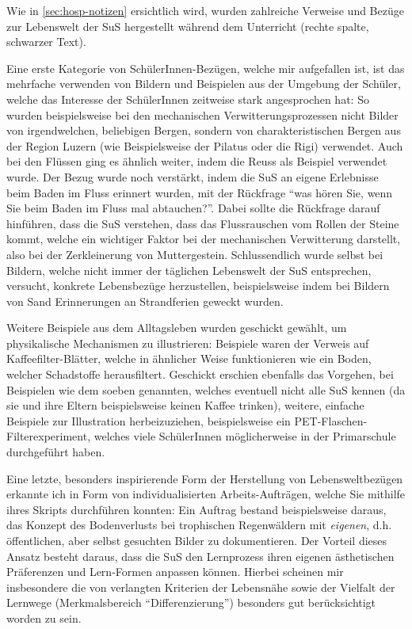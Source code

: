 Wie in \cref{sec:hosp-notizen} ersichtlich wird, wurden zahlreiche Verweise und Bezüge zur Lebenswelt der SuS hergestellt während dem Unterricht (rechte spalte, schwarzer Text).

Eine erste Kategorie von SchülerInnen-Bezügen, welche mir aufgefallen ist, ist das mehrfache verwenden von Bildern und Beispielen aus der Umgebung der Schüler, welche das Interesse der SchülerInnen zeitweise stark angesprochen hat: So wurden beispielsweise bei den mechanischen Verwitterungsprozessen nicht Bilder von irgendwelchen, beliebigen Bergen, sondern von charakteristischen Bergen aus der Region Luzern (wie Beispielsweise der Pilatus oder die Rigi) verwendet. Auch bei den Flüssen ging es ähnlich weiter, indem die Reuss als Beispiel verwendet wurde. Der Bezug wurde noch verstärkt, indem die SuS an eigene Erlebnisse beim Baden im Fluss erinnert wurden, mit der Rückfrage \enquote{was hören Sie, wenn Sie beim Baden im Fluss mal abtauchen?}. Dabei sollte die Rückfrage darauf hinführen, dass die SuS verstehen, dass das Flussrauschen vom Rollen der Steine kommt, welche ein wichtiger Faktor bei der mechanischen Verwitterung darstellt, also bei der Zerkleinerung von Muttergestein. Schlussendlich wurde selbst bei Bildern, welche nicht immer der täglichen Lebenswelt der SuS entsprechen, versucht, konkrete Lebensbezüge herzustellen, beispielsweise indem bei Bildern von Sand Erinnerungen an Strandferien geweckt wurden.

Weitere Beispiele aus dem Alltagsleben wurden geschickt gewählt, um physikalische Mechanismen zu illustrieren: Beispiele waren der Verweis auf Kaffeefilter-Blätter, welche in ähnlicher Weise funktionieren wie ein Boden, welcher Schadstoffe herausfiltert. Geschickt erschien ebenfalls das Vorgehen, bei Beispielen wie dem soeben genannten, welches eventuell nicht alle SuS kennen (da sie und ihre Eltern beispielsweise keinen Kaffee trinken), weitere, einfache Beispiele zur Illustration herbeizuziehen, beispielsweise ein PET-Flaschen-Filterexperiment, welches viele SchülerInnen möglicherweise in der Primarschule durchgeführt haben.

Eine letzte, besonders inspirierende Form der Herstellung von Lebensweltbezügen erkannte ich in Form von individualisierten Arbeits-Aufträgen, welche Sie mithilfe ihres Skripts durchführen konnten: Ein Auftrag bestand beispielsweise daraus, das Konzept des Bodenverlusts bei trophischen Regenwäldern mit \textit{eigenen}, d.h. öffentlichen, aber selbst gesuchten Bilder zu dokumentieren. Der Vorteil dieses Ansatz besteht daraus, dass die SuS den Lernprozess ihren eigenen ästhetischen Präferenzen und Lern-Formen anpassen können. Hierbei scheinen mir insbesondere die von \textcite{chem} verlangten Kriterien der Lebensnähe sowie der Vielfalt der Lernwege (Merkmalsbereich \enquote{Differenzierung}) besonders gut berücksichtigt worden zu sein.


